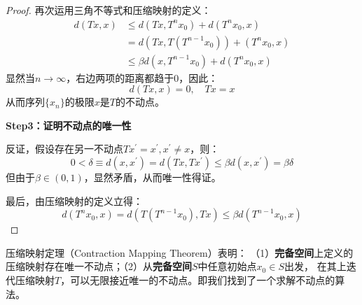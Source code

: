 \begin{proof}
    再次运用三角不等式和压缩映射的定义：
    \begin{equation*}
        \begin{aligned}
            d(T x, x) & \leq d\left(T x, T^n x_0\right)+d\left(T^n x_0, x\right) \\
            &= d\left(Tx,T\left(T^{n-1}x_0\right)\right) + \left(T^n x_0, x\right) \\
            & \leq \beta d\left(x, T^{n-1} x_0\right)+d\left(T^n x_0, x\right)
        \end{aligned} 
    \end{equation*}
    显然当$n\rightarrow \infty$，右边两项的距离都趋于0，因此：
    $$d\left(Tx,x\right)=0, \quad Tx = x$$
    从而序列$\{x_n\}$的极限$x$是$T$的不动点。

    \textbf{Step3：证明不动点的唯一性}

    反证，假设存在另一不动点$Tx^{\prime}=x^{\prime},x^{\prime} \neq x$，则：
    \begin{equation*}
        0<\delta \equiv d\left(x,x^{\prime}\right) = 
            d\left(Tx,Tx^{\prime}\right)\leq \beta d\left(x,x^{\prime}\right) =\beta \delta
    \end{equation*}
    但由于$\beta \in \left(0,1\right)$，显然矛盾，从而唯一性得证。

    最后，由压缩映射的定义立得：
    \begin{equation*}
        d\left(T^nx_0,x\right) = d\left(T\left(T^{n-1}x_0\right),Tx\right) \leq \beta d\left(T^{n-1}x_0,x\right)
    \end{equation*}
\end{proof}

压缩映射定理（Contraction Mapping Theorem）表明：
（1）\textbf{完备空间}上定义的压缩映射存在唯一不动点；（2）从\textbf{完备空间}$S$中任意初始点$x_0 \in S$出发，
在其上迭代压缩映射$T$，可以无限接近唯一的不动点。即我们找到了一个求解不动点的算法。

